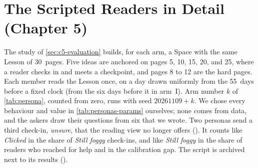 \section{The Scripted Readers in Detail (Chapter 5)}
\label{sec:c5-personas-detail}

The study of \cref{sec:c5-evaluation} builds, for each arm, a Space with the same Lesson of
30~pages. Five ideas are anchored on pages 5, 10, 15, 20, and 25, where a
reader checks in and meets a checkpoint, and pages 8 to 12 are the hard
pages. Each member reads the Lesson once, on a day drawn uniformly from the
55~days before a fixed clock (from the six days before it in arm~I). Arm
number $k$ of \cref{tab:persona}, counted from zero, runs with seed
$20261109 + k$. We chose every behaviour and value in
\cref{tab:personas-params} ourselves; none comes from data, and the askers
draw their questions from six that we wrote. Two personas send a third
check-in, \emph{unsure}, that the reading view no longer offers
(). It counts like \emph{Clicked} in the share of
\emph{Still foggy} check-ins, and like \emph{Still foggy} in the share of
readers who reached for help and in the calibration gap. The script is archived next to
its results ().

